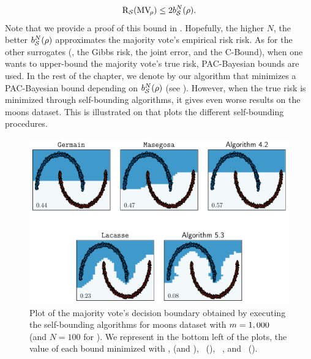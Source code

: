 \begin{align}
    \text{R}_{\mathcal{S}}(\text{MV}_{\!\rho}) \le 2b_{\mathcal{S}}^{N}(\rho).\label{chap:mv-sto:eq:lacasse}
\end{align}
Note that we provide a proof of this bound in .
Hopefully, the higher $N$, the better $b_{\mathcal{S}}^{N}(\rho)$ approximates the majority vote's empirical risk risk.
As for the other surrogates (\ie, the Gibbs risk, the joint error, and the C-Bound), when one wants to upper-bound the majority vote's true risk, PAC-Bayesian bounds are used.
In the rest of the chapter, we denote by \algolacasse our algorithm that minimizes a PAC-Bayesian bound depending on $b_{\mathcal{S}}^{N}(\rho)$ (see ).
However, when the true risk is minimized through self-bounding algorithms, it gives even worse results on the moons dataset.
This is illustrated on  that plots the different self-bounding procedures.

\begin{figure}
    \centering
    \includegraphics[width=1.0\linewidth]{chapter_5/figures/moons_bound.pdf}
    \caption[Comparison of the Self-bounding Algorithms on Moons]{Plot of the majority vote's decision boundary obtained by executing the self-bounding algorithms for moons dataset with $m=1,000$ (and $N = 100$ for \algolacasse).
    We represent in the bottom left of the plots, the value of each bound minimized with ,  (and ), \algogermain~(), \algomasegosa~\citep[Appendix~G]{MasegosaLorenzenIgelSeldin2020}, and \algolacasse~(). 
    }
    \label{chap:mv-sto:fig:moons-bound}
\end{figure}

